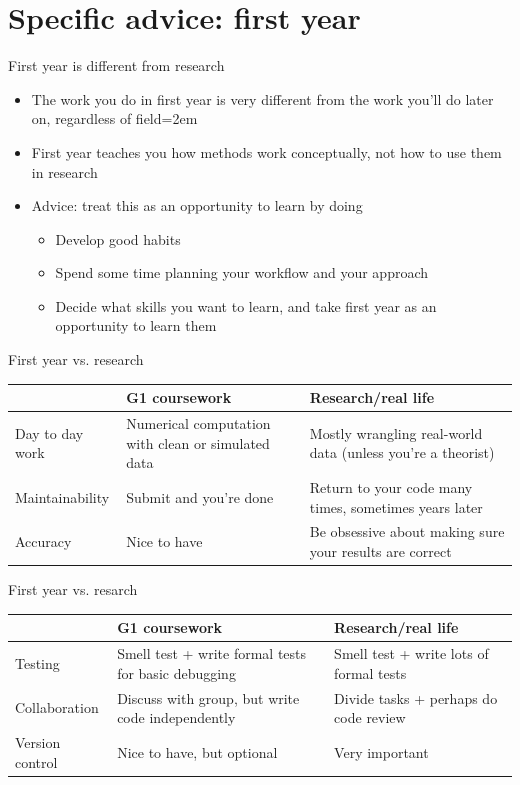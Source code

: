 \documentclass[handout]{beamer}
\begin{document}
\section{Specific advice: first year}

\begin{frame}{First year is different from research}
\begin{itemize}
    \item The work you do in first year is very different from the work you'll do later on, regardless of field\itemsep=2em
    \item First year teaches you how methods work conceptually, not how to use them in research
    \item<2-> Advice: treat this as an opportunity to learn by doing
    \begin{itemize}
        \item Develop good habits
        \item Spend some time planning your workflow and your approach
        \item Decide what skills you want to learn, and take first year as an opportunity to learn them
    \end{itemize}
\end{itemize}
\end{frame}

\begin{frame}{First year vs. research}
    \begin{tabular}{p{2.5cm}|p{3.5cm}|p{3.5cm}}
    & G1 coursework & Research/real life \\
    \hline
    Day to day work &
Numerical computation with clean or simulated data &
Mostly wrangling real-world data (unless you're a theorist) \\
\hline
Maintainability &
Submit and you're done &
Return to your code many times, sometimes years later \\
\hline
Accuracy &
Nice to have &
Be obsessive about making sure your results are correct \\
    \end{tabular}
\end{frame}

\begin{frame}{First year vs. resarch}
    \begin{tabular}{p{2cm}|p{4cm}|p{4cm}}
    & G1 coursework & Research/real life \\
    \hline
Testing &
Smell test + write formal tests for basic debugging &
Smell test + write lots of formal tests \\
\hline
Collaboration &
Discuss with group, but write code independently &
Divide tasks + perhaps do code review \\
\hline
Version control &
Nice to have, but optional &
Very important
    \end{tabular}
\end{frame}
\end{document}
